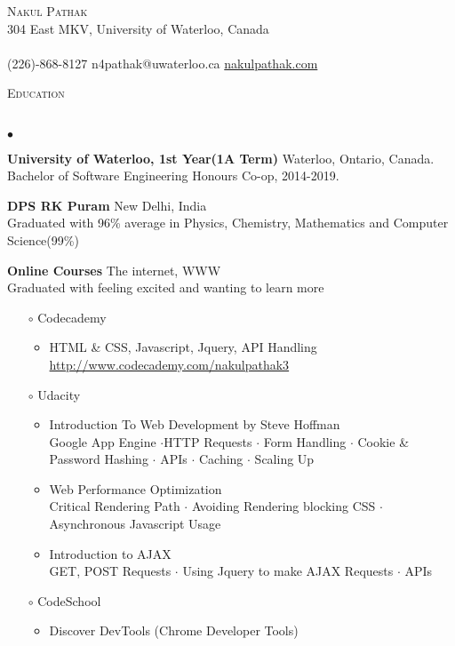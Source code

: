 \documentclass{article}
\newcommand{\lineunder}{\vspace*{-8pt} \\ \hspace*{-18pt} \hrulefill \\}
\newcommand{\address}{\vspace*{-8pt} \\ \hspace*{-18pt}  \\}
\newcommand{\header}[1]{{\hspace*{-15pt}\vspace*{6pt} \textsc{#1}} \vspace*{-6pt} \lineunder}
\newcommand{\contact}[3]{
\vspace*{-8pt}
\begin{center}
{\LARGE \scshape {#1}}\\
\vspace {3pt}
#2 \address
#3
\end{center}
\vspace*{-8pt}
}
\newenvironment{achievements}{\begin{list}{$\bullet$}{\topsep 0pt \itemsep -1.5pt \leftmargin 5pt}}{\vspace*{4pt}\end{list}}
\begin{document}
\small
\smallskip
\vspace*{-45pt}

\contact{Nakul Pathak}
{\normalsize 304 East MKV, University of Waterloo, Canada}
{ \normalsize(226)-868-8127  \hfill n4pathak@uwaterloo.ca   \hfill \urlstyle{same}\url{nakulpathak.com}}

\vspace{10pt}
\header{Education}
\begin{achievements}
\item \textbf{University of Waterloo, 1st Year(1A Term)} Waterloo, Ontario, Canada. \\ Bachelor of Software Engineering Honours Co-op, 2014-2019. 
\item \textbf{DPS RK Puram} New Delhi, India \\ Graduated with 96\% average in Physics, Chemistry, Mathematics and Computer Science(99\%)
\item \textbf{Online Courses} The internet, WWW \\ Graduated with feeling excited and wanting to learn more
\vspace{-4pt}
\begin{itemize}
	\item[$\circ$] Codecademy
	\begin{itemize}
	\vspace{-2pt}
	\item HTML \& CSS, Javascript, Jquery, API Handling 
	\\ \url{http://www.codecademy.com/nakulpathak3}
	\end{itemize}
	\vspace{-3.5pt}
\item[$\circ$] Udacity
	\begin{itemize}
	\vspace{-2pt}
	\item Introduction To Web Development by Steve Hoffman 
	\\  Google App Engine $\cdot$HTTP Requests  $\cdot$ Form Handling $\cdot$ Cookie \& Password Hashing $\cdot$ APIs $\cdot$ Caching $\cdot$ Scaling Up
	\vspace{-2pt}
	\item Web Performance Optimization
	\\ Critical Rendering Path $\cdot$ Avoiding Rendering blocking CSS $\cdot$ Asynchronous Javascript Usage
	\vspace{-2pt}
	\item Introduction to AJAX
	\\ GET, POST Requests $\cdot$ Using Jquery to make AJAX Requests $\cdot$ APIs
	\end{itemize}
	\vspace{-3.5pt}
\item[$\circ$] CodeSchool
	\begin{itemize}
	\vspace{-2pt}
	\item Discover DevTools (Chrome Developer Tools)
	\end{itemize}
	\end{itemize}
\end{achievements}
\end{document}
